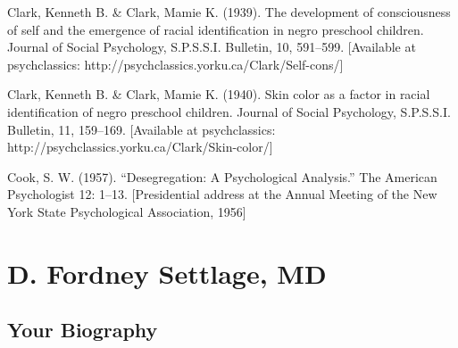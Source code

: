 Clark, Kenneth B. \& Clark, Mamie K. (1939). The development of consciousness of self and the emergence of racial identification in negro preschool children. Journal of Social Psychology, S.P.S.S.I. Bulletin, 10, 591--599. [Available at psychclassics: http:\slash \slash psychclassics.yorku.ca\slash Clark\slash Self-cons\slash ]

Clark, Kenneth B. \& Clark, Mamie K. (1940). Skin color as a factor in racial identification of negro preschool children. Journal of Social Psychology, S.P.S.S.I. Bulletin, 11, 159--169. [Available at psychclassics: http:\slash \slash psychclassics.yorku.ca\slash Clark\slash Skin-color\slash ]

Cook, S. W. (1957). ``Desegregation: A Psychological Analysis.'' The American Psychologist 12: 1--13. [Presidential address at the Annual Meeting of the New York State Psychological Association, 1956]

\chapter{D. Fordney Settlage, MD}
\label{d.fordneysettlagemd}

\section{Your Biography}
\label{yourbiography}

